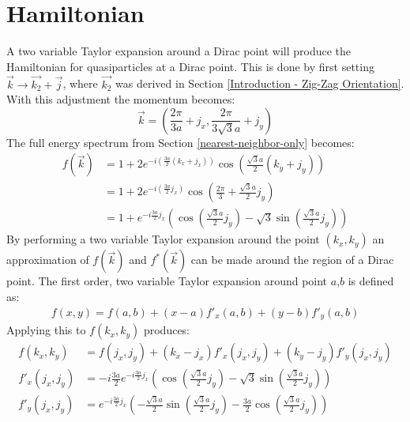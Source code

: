 		\section{Hamiltonian}
		\label{Introduction - Hamiltonian}
			A two variable Taylor expansion around a Dirac point will produce the Hamiltonian for quasiparticles at a Dirac point. This is done by first setting $\vec{k}\rightarrow \vec{k_{2}}+\vec{j}$, where $\vec{k_{2}}$ was derived in Section \ref{Introduction - Zig-Zag Orientation}. With this adjustment the momentum becomes:
			\begin{equation}
				\vec{k}=\left(\frac{2\pi}{3a}+j_{x},\frac{2\pi}{3\sqrt{3}a}+j_{y}\right)
				\label{kpoint}
			\end{equation}
			The full energy spectrum from Section \ref{nearest-neighbor-only} becomes:
			\begin{align}
				f\left(\vec{k}\right)&=1+2e^{-i\left(\frac{3a}{2}\left(k_{x}+j_{x}\right)\right)}\cos\left(\frac{\sqrt{3}a}{2}\left(k_{y}+j_{y}\right)\right)\\
				&=1+2e^{-i\left(\frac{3a}{2}j_{x}\right)}\cos\left(\frac{2\pi}{3}+\frac{\sqrt{3}a}{2}j_{y}\right)\\
				&=1+e^{-i\frac{3a}{2}j_{x}}\left(\cos\left(\frac{\sqrt{3}a}{2}j_{y}\right)-\sqrt{3}\sin\left(\frac{\sqrt{3}a}{2}j_{y}\right)\right)
			\end{align}
			By performing a two variable Taylor expansion around the point $\left(k_{x}, k_{y}\right)$ an approximation of $f(\vec{k})$ and $f^{*}(\vec{k})$ can be made around the region of a Dirac point. The first order, two variable Taylor expansion around point $a$,$b$ is defined as:
			\begin{align}
				f\left(x,y\right)=f\left(a,b\right)+\left(x-a\right)f'_{x}\left(a,b\right)+\left(y-b\right)f'_{y}\left(a,b\right)
			\end{align}
			Applying this to $f\left(k_{x},k_{y}\right)$ produces:
			\begin{align}
				f\left(k_{x},k_{y}\right)&=f\left(j_{x},j_{y}\right)+\left(k_{x}-j_{x}\right)f'_{x}\left(j_{x},j_{y}\right)+\left(k_{y}-j_{y}\right)f'_{y}\left(j_{x},j_{y}\right)\\
				f'_{x}\left(j_{x},j_{y}\right)&=-i\frac{3a}{2}e^{-i\frac{3a}{2}j_{x}}\left(\cos\left(\frac{\sqrt{3}a}{2}j_{y}\right)-\sqrt{3}\sin\left(\frac{\sqrt{3}a}{2}j_{y}\right)\right)\\
				f'_{y}\left(j_{x},j_{y}\right)&=e^{-i\frac{3a}{2}j_{x}}\left(-\frac{\sqrt{3}a}{2}\sin\left(\frac{\sqrt{3}a}{2}j_{y}\right)-\frac{3a}{2}\cos\left(\frac{\sqrt{3}a}{2}j_{y}\right)\right)
			\end{align}
